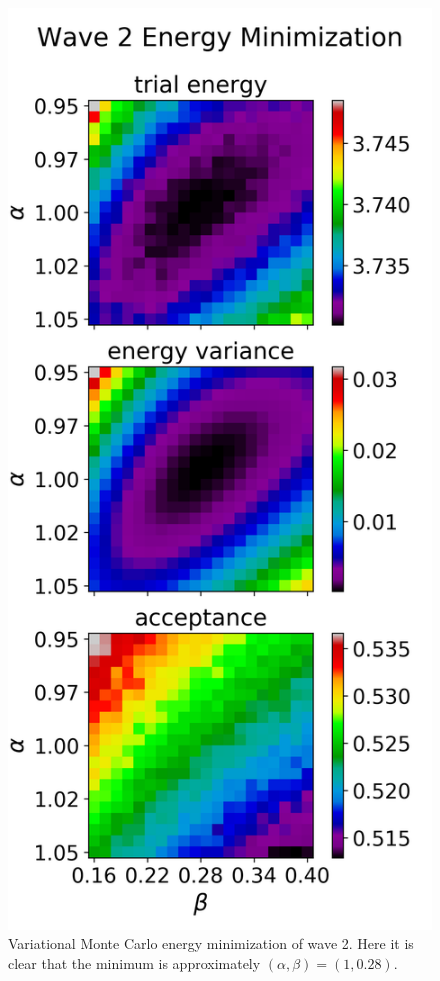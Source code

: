 \documentclass[nofootinbib,reprint,english]{revtex4-1}
\begin{document}
\begin{figure}[h!]
\centering
\includegraphics[scale=0.7]{../results/wave2/energy_minimization_4.png}
\caption{Variational Monte Carlo energy minimization of wave 2. Here it is clear that the minimum is approximately \((\alpha,\beta)=(1,0.28)\). }\label{fig:wave2_optimization2}
\end{figure}
\end{document}
